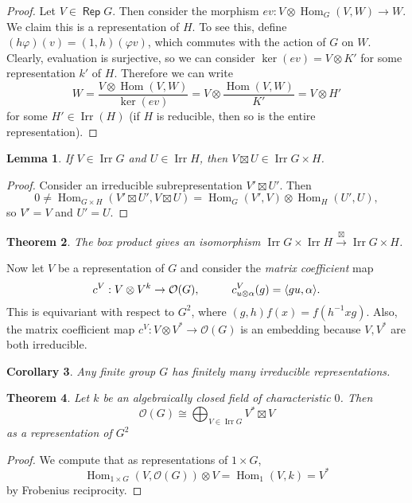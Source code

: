 \documentclass[leqno, openany]{memoir}
\DeclarePairedDelimiter{\gen}{\langle}{\rangle}
\newtheorem{thm}{Theorem}[chapter]
\newtheorem{cor}[thm]{Corollary}
\newtheorem{lem}[thm]{Lemma}
\theoremstyle{definition}
\theoremstyle{remark}
\theoremstyle{plain}
\theoremstyle{definition}
\theoremstyle{remark}
\newcommand{\mc}[1]{\mathcal{#1}}
\DeclareMathOperator{\Irr}{\mathrm{Irr}}
\DeclareMathOperator{\Rep}{\mathsf{Rep}}
\DeclareMathOperator{\Hom}{Hom}
\begin{document}
\begin{proof} Let $V \in \Rep G$. Then consider the morphism $ev: V \otimes
    \Hom_G(V, W) \to W$. We claim this is a representation of $H$. To see this,
    define $(h \varphi)(v) = (1,h)(\varphi v)$, which commutes with the action
    of $G$ on $W$. Clearly, evaluation is surjective, so we can consider
    $\ker(ev) = V \otimes K'$ for some representation $k'$ of $H$. Therefore we
    can write \[ W = \frac{V \otimes \Hom(V, W)}{\ker(ev)} = V \otimes
    \frac{\Hom(V, W)}{K'} = V \otimes H' \] for some $H' \in \Irr(H)$ (if $H$
is reducible, then so is the entire representation).  \end{proof}

\begin{lem} If $V \in \Irr G$ and $U \in \Irr H$, then $V \boxtimes U \in \Irr
G \times H$.  \end{lem}

\begin{proof} Consider an irreducible subrepresentation $V' \boxtimes U'$. Then
    \[ 0 \neq \Hom_{G \times H}(V' \boxtimes U', V \boxtimes U) = \Hom_G(V',V)
    \otimes \Hom_H(U', U), \] so $V' = V$ and $U' = U$.  \end{proof}

\begin{thm} The box product gives an isomorphism $\Irr G \times \Irr H
\xrightarrow{\boxtimes} \Irr G \times H$.  \end{thm}

Now let $V$ be a representation of $G$ and consider the \textit{matrix
coefficient} map \[ c^V: V \otimes V^k \to \mc{O}(G), \hspace{1cm} c^V_{u
\otimes \alpha}(g) = \gen{gu, \alpha}. \] This is equivariant with respect to
$G^2$, where $(g,h)f(x) = f(h^{-1}xg)$. Also, the matrix coefficient map $c^V:
V \otimes V^* \to \mc{O}(G)$ is an embedding because $V, V^*$ are both
irreducible.

\begin{cor} Any finite group $G$ has finitely many irreducible representations.
\end{cor}

\begin{thm} Let $k$ be an algebraically closed field of characteristic $0$.
    Then \[ \mc{O}(G) \cong \bigoplus_{V \in \Irr G} V^* \boxtimes V \] as a
representation of $G^2$ \end{thm}

\begin{proof} We compute that as representations of $1 \times G$, \[ \Hom_{1
\times G}(V, \mc{O}(G)) \otimes V = \Hom_1(V, k) = V^* \] by Frobenius
reciprocity.  \end{proof}
\end{document}
